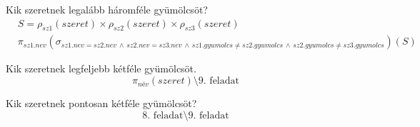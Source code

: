 \documentclass[a4paper,12pt]{article}
\theoremstyle{definition}
\begin{document}
\begin{exercise}
	Kik szeretnek legalább háromféle gyümölcsöt?
	\begin{align*}
	& S = \rho_{sz1}\left(szeret\right) \times \rho_{sz2}\left(szeret\right) \times \rho_{sz3}\left(szeret\right) \\
	&\pi_{sz1.nev}\left(\sigma_{sz1.nev = sz2.nev \, \land \, sz2.nev = sz3.nev \, \land \, sz1.gyumolcs \ne sz2.gyumolcs \, \land \, sz2.gyumolcs \ne sz3.gyumolcs}\right){\left( S \right) }
	\end{align*}
\end{exercise}

\begin{exercise}
	Kik szeretnek legfeljebb kétféle gyümölcsöt.
	\[
	\pi_{név}\left(szeret \right) \setminus {\text{9. feladat}}
	\]
\end{exercise}

\begin{exercise}
	Kik szeretnek pontosan kétféle gyümölcsöt?
	\[
	\text{8. feladat} \setminus \text{9. feladat}
	\]
\end{exercise}
\end{document}
